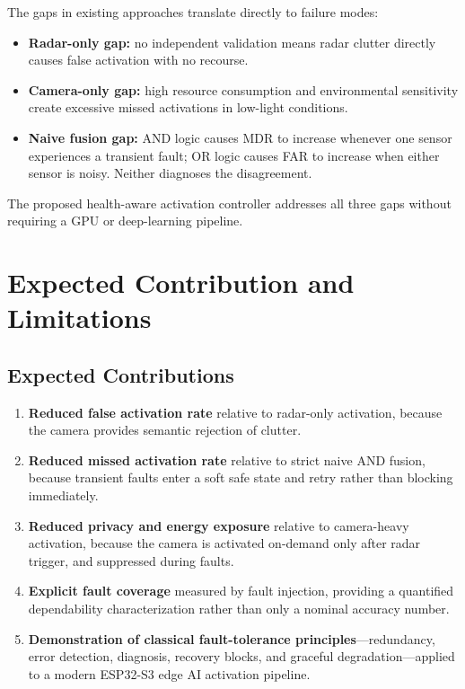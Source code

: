 \documentclass[12pt]{extarticle}
\begin{document}
The gaps in existing approaches translate directly to failure modes:
\begin{itemize}
  \item \textbf{Radar-only gap:} no independent validation means radar clutter
        directly causes false activation with no recourse.
  \item \textbf{Camera-only gap:} high resource consumption and environmental
        sensitivity create excessive missed activations in low-light conditions.
  \item \textbf{Naive fusion gap:} AND logic causes MDR to increase whenever one
        sensor experiences a transient fault; OR logic causes FAR to increase when
        either sensor is noisy.
        Neither diagnoses the disagreement.
\end{itemize}

The proposed health-aware activation controller addresses all three gaps without
requiring a GPU or deep-learning pipeline.

\section{Expected Contribution and Limitations}
\label{sec:contribution}

\subsection{Expected Contributions}

\begin{enumerate}
  \item \textbf{Reduced false activation rate} relative to radar-only activation,
        because the camera provides semantic rejection of clutter.
  \item \textbf{Reduced missed activation rate} relative to strict naive AND fusion,
        because transient faults enter a soft safe state and retry rather than
        blocking immediately.
  \item \textbf{Reduced privacy and energy exposure} relative to camera-heavy
        activation, because the camera is activated on-demand only after radar trigger,
        and suppressed during faults.
  \item \textbf{Explicit fault coverage} measured by fault injection, providing a
        quantified dependability characterization rather than only a nominal accuracy
        number.
  \item \textbf{Demonstration of classical fault-tolerance principles}---redundancy,
        error detection, diagnosis, recovery blocks, and graceful degradation---applied
        to a modern ESP32-S3 edge AI activation pipeline.
\end{enumerate}
\end{document}
